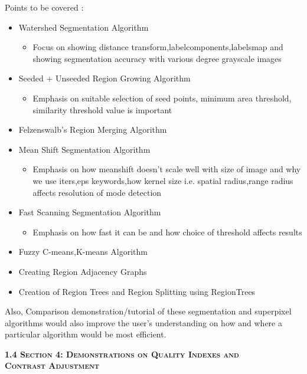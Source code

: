 Points to be covered :
\begin{itemize}[no 5titemsep,topsep=0]
    \item Watershed Segmentation Algorithm
    \begin{itemize}
        \item Focus on showing distance transform,labelcomponents,labelsmap and showing segmentation accuracy with various degree grayscale images
    \end{itemize}
    \item Seeded + Unseeded Region Growing Algorithm
    \begin{itemize}
        \item Emphasis on suitable selection of seed points, minimum area threshold, similarity threshold value is important
    \end{itemize}
    \item Felzenswalb's Region Merging Algorithm
        
    \item Mean Shift Segmentation Algorithm
    \begin{itemize}
        \item Emphasis on how meanshift doesn't scale well with size of image and why we use iters,eps keywords,how kernel size i.e. spatial radius,range radius affects resolution of mode detection
    \end{itemize}
    \item Fast Scanning Segmentation Algorithm
    \begin{itemize}
        \item Emphasis on how fast it can be and how choice of threshold affects results
    \end{itemize}
    \item Fuzzy C-means,K-means Algorithm
    \item Creating Region Adjacency Graphs
    \item Creation of Region Trees and Region Splitting using RegionTrees
\end{itemize}

\vspace{0.3cm}
Also, Comparison demonstration/tutorial of these segmentation and superpixel algorithms would also improve the user's understanding on how and where a particular algorithm would be most efficient.

\vspace{0.5cm}
\Large
\textbf{\textsc{1.4 Section 4: Demonstrations on Quality Indexes and\\ Contrast Adjustment}}

